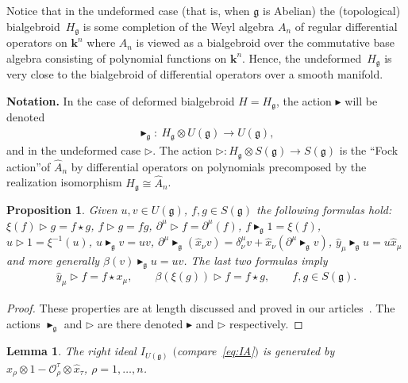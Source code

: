 \documentclass[pdftex]{sigma}
\def\genfd{\mathbf{k}}
\def\gg{\mathfrak{g}}
\def\hx{\hat{x}}
\def\hy{\hat{y}}
\newtheorem{Lemma}[Theorem]{Lemma}
\newtheorem{Proposition}[Theorem]{Proposition}
 { \theoremstyle{definition}
\newtheorem{Definition}[Theorem]{Definition}
\newtheorem{Example}[Theorem]{Example}
\newtheorem{Remark}[Theorem]{Remark} }
\numberwithin{equation}{section}
\begin{document}
Notice that in the undeformed case (that is, when $\gg$ is Abelian) the (topological) bialgebroid~$H_\gg$ is some completion of the Weyl algebra $A_n$ of regular differential operators on $\genfd^n$ where $A_n$ is viewed as a bialgebroid over the commutative base algebra consisting of polynomial functions on $\genfd^n$. Hence, the undeformed~$H_\gg$ is very close to the bialgebroid of differential operators over a smooth manifold.

{\bf Notation.} In the case of deformed bialgebroid $H = H_\gg$, the action $\blacktriangleright$ will be denoted
\begin{gather*}%
\blacktriangleright_\gg\colon \ H_\gg\otimes U(\gg)\to U(\gg),\end{gather*}
and in the undeformed case $\triangleright$. The action $\triangleright \colon H_\gg\otimes S(\gg)\to S(\gg)$ is the ``Fock action''of $\hat{A}_n$ by differential operators on polynomials precomposed by the realization isomorphism $H_\gg\cong\hat{A}_n$.

\begin{Proposition}
Given $u,v\in U(\gg)$, $f,g\in S(\gg)$ the following formulas hold: $\xi(f)\triangleright g = f\star g$, $f\triangleright g = f g$, $\partial^\mu\triangleright f = \partial^\mu(f)$, $f\blacktriangleright_\gg 1 = \xi(f)$, $u\triangleright 1 = \xi^{-1}(u)$, $u\blacktriangleright_\gg v = u v$, $\partial^\mu\blacktriangleright_\gg(\hx_\nu v)= \delta^\mu_\nu v + \hx_\nu (\partial^\mu\blacktriangleright_\gg v)$, $\hy_\mu\blacktriangleright_\gg u = u \hx_\mu$ and more generally $\beta(v)\blacktriangleright_\gg u = u v$. The last two formulas imply
\begin{gather}\label{eq:betastar}
\hy_\mu\triangleright f = f\star x_\mu,\qquad \beta(\xi(g))\triangleright f = f\star g,\qquad f,g\in S(\gg).
\end{gather}
\end{Proposition}
\begin{proof} These properties are at length discussed and proved in our articles~\cite{scopr,halg,heisd}. The actions $\blacktriangleright_\gg$ and $\triangleright$ are there denoted $\blacktriangleright$ and $\triangleright$ respectively.
\end{proof}

\begin{Lemma}\label{lem:IUg}
The right ideal $I_{U(\gg)}$ $($compare~\eqref{eq:IA}$)$ is generated by $\hat{x}_\rho\otimes 1 - \mathcal{O}^\tau_\rho\otimes\hat{x}_\tau$, $\rho = 1,\dots, n$.
\end{Lemma}
\end{document}
